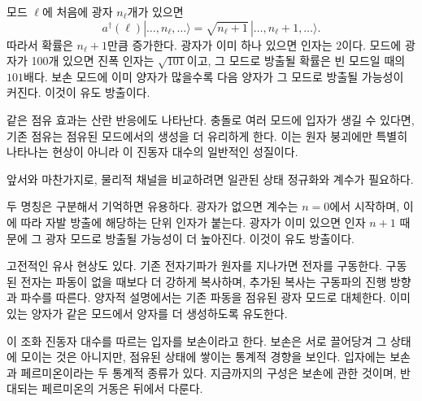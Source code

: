 모드 \(\ell\)에 처음에 광자 \(n_\ell\)개가 있으면
\begin{equation}
a^\dagger(\ell)
|\ldots,n_\ell,\ldots\rangle
=
\sqrt{n_\ell+1}
\,|\ldots,n_\ell+1,\ldots\rangle.
\end{equation}
따라서 확률은 \(n_\ell+1\)만큼 증가한다. 광자가 이미 하나 있으면 인자는 \(2\)이다. 모드에 광자가 100개 있으면 진폭 인자는 \(\sqrt{101}\)이고, 그 모드로 방출될 확률은 빈 모드일 때의 \(101\)배다. 보손 모드에 이미 양자가 많을수록 다음 양자가 그 모드로 방출될 가능성이 커진다. 이것이 유도 방출이다.

같은 점유 효과는 산란 반응에도 나타난다. 충돌로 여러 모드에 입자가 생길 수 있다면, 기존 점유는 점유된 모드에서의 생성을 더 유리하게 한다. 이는 원자 붕괴에만 특별히 나타나는 현상이 아니라 이 진동자 대수의 일반적인 성질이다.

\begin{classroomqa}\end{classroomqa}

앞서와 마찬가지로, 물리적 채널을 비교하려면 일관된 상태 정규화와 계수가 필요하다.

\begin{classroomqa}\end{classroomqa}

두 명칭은 구분해서 기억하면 유용하다. 광자가 없으면 계수는 \(n=0\)에서 시작하며, 이에 따라 자발 방출에 해당하는 단위 인자가 붙는다. 광자가 이미 있으면 인자 \(n+1\) 때문에 그 광자 모드로 방출될 가능성이 더 높아진다. 이것이 유도 방출이다.

고전적인 유사 현상도 있다. 기존 전자기파가 원자를 지나가면 전자를 구동한다. 구동된 전자는 파동이 없을 때보다 더 강하게 복사하며, 추가된 복사는 구동파의 진행 방향과 파수를 따른다. 양자적 설명에서는 기존 파동을 점유된 광자 모드로 대체한다. 이미 있는 양자가 같은 모드에서 양자를 더 생성하도록 유도한다.

이 조화 진동자 대수를 따르는 입자를 보손이라고 한다. 보손은 서로 끌어당겨 그 상태에 모이는 것은 아니지만, 점유된 상태에 쌓이는 통계적 경향을 보인다. 입자에는 보손과 페르미온이라는 두 통계적 종류가 있다. 지금까지의 구성은 보손에 관한 것이며, 반대되는 페르미온의 거동은 뒤에서 다룬다.

